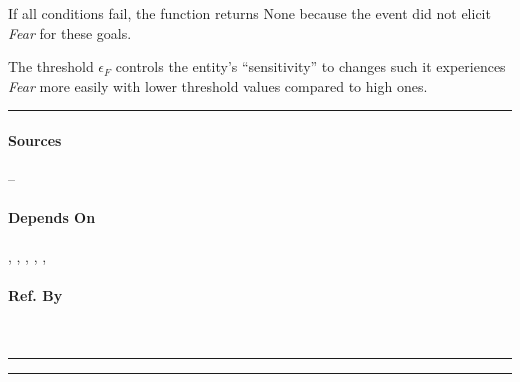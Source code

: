 If all conditions fail, the function returns None because the event did not
elicit \textit{Fear} for these goals.

The threshold $\epsilon_{F}$ controls the entity's ``sensitivity'' to changes
such it experiences \textit{Fear} more easily with lower threshold values
compared to high ones. \\\hrule

\paragraph{Sources} --

\paragraph{Depends On} , ,
, ,
, 

\paragraph{Ref. By}  \\\hrule\vspace{0.5mm}\hrule

~\newline

